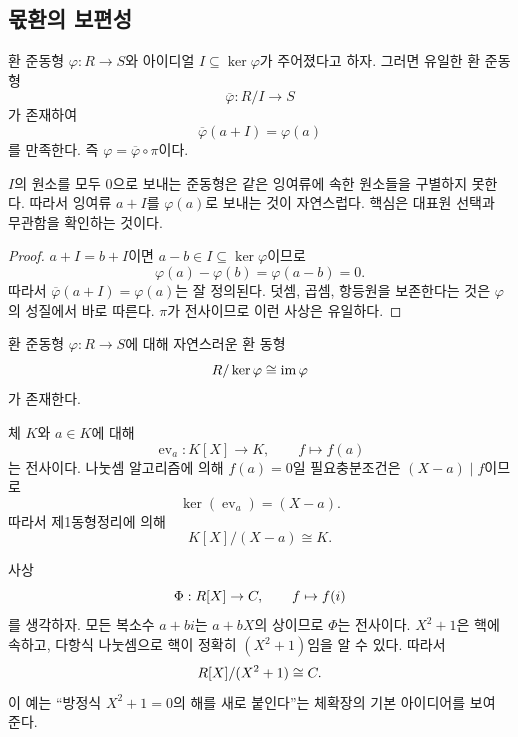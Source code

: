 \subsection{몫환의 보편성}

\begin{theorem}
환 준동형 $\varphi:R\to S$와 아이디얼 $I\subseteq\ker\varphi$가 주어졌다고 하자. 그러면 유일한 환 준동형
\[
  \overline\varphi:R/I\to S
\]
가 존재하여
\[
  \overline\varphi(a+I)=\varphi(a)
\]
를 만족한다. 즉 $\varphi=\overline\varphi\circ\pi$이다.
\end{theorem}

\begin{proofidea}
$I$의 원소를 모두 $0$으로 보내는 준동형은 같은 잉여류에 속한 원소들을 구별하지 못한다. 따라서 잉여류 $a+I$를 $\varphi(a)$로 보내는 것이 자연스럽다. 핵심은 대표원 선택과 무관함을 확인하는 것이다.
\end{proofidea}

\begin{proof}
$a+I=b+I$이면 $a-b\in I\subseteq\ker\varphi$이므로
\[
  \varphi(a)-\varphi(b)=\varphi(a-b)=0.
\]
따라서 $\overline\varphi(a+I)=\varphi(a)$는 잘 정의된다. 덧셈, 곱셈, 항등원을 보존한다는 것은 $\varphi$의 성질에서 바로 따른다. $\pi$가 전사이므로 이런 사상은 유일하다.
\end{proof}

\begin{corollary}[제1동형정리]
환 준동형 $\varphi:R\to S$에 대해 자연스러운 환 동형
\[
  R/\ker\varphi\cong\operatorname{im}\varphi
\]
가 존재한다.
\end{corollary}

\begin{example}
체 $K$와 $a\in K$에 대해
\[
  \operatorname{ev}_a:K[X]\to K,\qquad f\mapsto f(a)
\]
는 전사이다. 나눗셈 알고리즘에 의해 $f(a)=0$일 필요충분조건은 $(X-a)\mid f$이므로
\[
  \ker(\operatorname{ev}_a)=(X-a).
\]
따라서 제1동형정리에 의해
\[
  K[X]/(X-a)\cong K.
\]
\end{example}

\begin{example}
사상
\[
  \Phi:R[X]\to C,\qquad f\mapsto f(i)
\]
를 생각하자. 모든 복소수 $a+bi$는 $a+bX$의 상이므로 $\Phi$는 전사이다. $X^2+1$은 핵에 속하고, 다항식 나눗셈으로 핵이 정확히 $(X^2+1)$임을 알 수 있다. 따라서
\[
  R[X]/(X^2+1)\cong C.
\]
이 예는 ``방정식 $X^2+1=0$의 해를 새로 붙인다''는 체확장의 기본 아이디어를 보여 준다.
\end{example}

